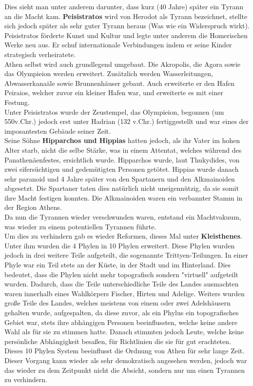 \documentclass{article}
\begin{document}
	Dies sieht man unter anderem darunter, dass kurz (40 Jahre) später ein Tyrann an die Macht kam. \textbf{Peisistratos} wird von Herodot als Tyrann bezeichnet, stellte sich jedoch später als sehr guter Tyrann heraus (Was wie ein Widerspruch wirkt). \\
	Peisistratos förderte Kunst und Kultur und legte unter anderem die Homerischen Werke neu aus. Er schuf internationale Verbindungen indem er seine Kinder strategisch verheiratete. \\
	Athen selbst wird auch grundlegend umgebaut. Die Akropolis, die Agora sowie das Olympieion werden erweitert. Zusätzlich werden Wasserleitungen, Abwasserkanaäle sowie Brunnenhäuser gebaut. Auch erweiterte er den Hafen Peiraios, welcher zuvor ein kleiner Hafen war, und erweiterte es mit einer Festung. \\
	Unter Peisistratos wurde der Zeustempel, das Olympieion, begonnen (um 550v.Chr.) jedoch erst unter Hadrian (132 v.Chr.) fertiggestellt und war eines der imposantesten Gebäude seiner Zeit. \\
	Seine Söhne \textbf{Hipparchos und Hippias} hatten jedoch, als ihr Vater im hohen Alter starb, nicht die selbe Stärke, was in einem Attentat, welches während des Panathenäenfestes, ersichtlich wurde. Hipparchos wurde, laut Thukydides, von zwei eifersüchtigen und gedemütigten Personen getötet. Hippias wurde danach sehr paranoid und 4 Jahre später von den Spartanern und den Alkmainoiden abgesetzt. Die Spartaner taten dies natürlich nicht uneigennützig, da sie somit ihre Macht festigen konnten. Die Alkmainoiden waren ein verbannter Stamm in der Region Athens. \\
	Da nun die Tyrannen wieder verschwunden waren, entstand ein Machtvakuum, was wieder zu einem potentiellen Tyrannen führte. \\
	Um dies zu verhindern gab es wieder Reformen, dieses Mal unter \textbf{Kleisthenes}.\\
	Unter ihm wurden die 4 Phylen in 10 Phylen erweitert. Diese Phylen wurden jedoch in drei weitere Teile aufgeteilt, die sogenannte Trittyen-Teilungen. In einer Phyle war ein Teil stets an der Küste, in der Stadt und im Hinterland. Dies bedeutet, dass die Phylen nicht mehr topografisch sondern "virtuell" aufgeteilt wurden. Dadurch, dass die Teile unterschiedliche Teile des Landes ausmachten waren innerhalb eines Wahlkörpers Fischer, Hirten und Adelige. Weiters wurden große Teile des Landes, welches meistens von einem oder zwei Adelshäusern gehalten wurde, aufgespalten, da diese zuvor, als ein Phylus ein topografisches Gebiet war, stets ihre abhängigen Personen beeinflussten, welche keine andere Wahl als für sie zu stimmen hatte. Danach stimmten jedoch Leute, welche keine persönliche Abhängigkeit besaßen, für Richtlinien die sie für gut erachteten. Dieses 10 Phylen System beeinflusst die Ordnung von Athen für sehr lange Zeit. Dieser Vorgang kann wieder als sehr demokratisch angesehen werden, jedoch war das wieder zu dem Zeitpunkt nicht die Absicht, sondern nur um einen Tyrannen zu verhindern. \\
\end{document}
